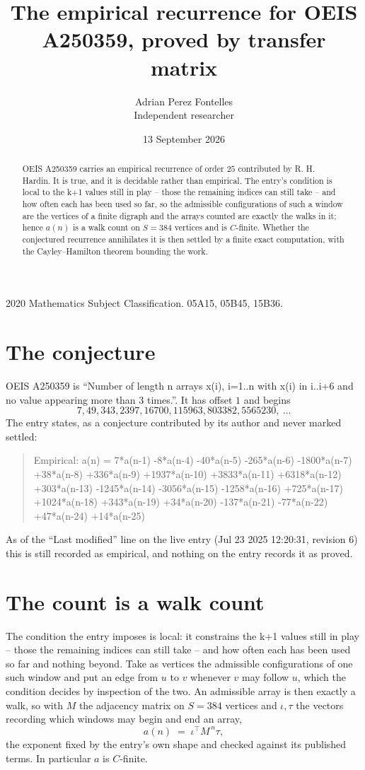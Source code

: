 \documentclass[11pt,a4paper]{article}
\title{The empirical recurrence for OEIS A250359, proved by transfer matrix}
\author{Adrian Perez Fontelles\\ \small Independent researcher}
\date{13 September 2026}
\theoremstyle{plain}
\theoremstyle{definition}
\begin{document}
\maketitle

\begin{abstract}
OEIS A250359 carries an empirical recurrence of order $25$ contributed by R. H. Hardin. It is
true, and it is decidable rather than empirical. The entry's condition is local to the k+1 values still in play -- those the remaining indices can still take -- and how often each has been used so far, so
the admissible configurations of such a window are the vertices of a finite digraph and the
arrays counted are exactly the walks in it; hence $a(n)$ is a walk count on $S=384$ vertices
and is $C$-finite. Whether the conjectured recurrence annihilates it is then settled by a
finite exact computation, with the Cayley--Hamilton theorem bounding the work.
\end{abstract}

\noindent\small 2020 Mathematics Subject Classification. 05A15, 05B45, 15B36.\normalsize

\section{The conjecture}

OEIS A250359 is ``Number of length n arrays x(i), i=1..n with x(i) in i..i+6 and no value appearing more than 3 times.''. It has offset $1$ and begins
\[
7, 49, 343, 2397, 16700, 115963, 803382, 5565230,\ \dots
\]
The entry states, as a conjecture contributed by its author and never marked settled:
\begin{quote}
Empirical: a(n) = 7*a(n-1) -8*a(n-4) -40*a(n-5) -265*a(n-6) -1800*a(n-7) +38*a(n-8) +336*a(n-9) +1937*a(n-10) +3833*a(n-11) +6318*a(n-12) +303*a(n-13) -1245*a(n-14) -3056*a(n-15) -1258*a(n-16) +725*a(n-17) +1024*a(n-18) +343*a(n-19) +34*a(n-20) -137*a(n-21) -77*a(n-22) +47*a(n-24) +14*a(n-25)
\end{quote}
As of the ``Last modified'' line on the live entry (Jul 23 2025 12:20:31, revision 6) this is still
recorded as empirical, and nothing on the entry records it as proved.

\section{The count is a walk count}

The condition the entry imposes is local: it constrains the k+1 values still in play -- those the remaining indices can still take -- and how often each has been used so far and nothing beyond. Take as
vertices the admissible configurations of one such window and put an edge from $u$ to $v$
whenever $v$ may follow $u$, which the condition decides by inspection of the two. An
admissible array is then exactly a walk, so with $M$ the adjacency matrix on $S=384$ vertices
and $\iota,\tau$ the vectors recording which windows may begin and end an array,
\[
a(n)\;=\;\iota^{\!\top}M^{\,n}\tau ,
\]
the exponent fixed by the entry's own shape and checked against its published terms. In
particular $a$ is $C$-finite.
\end{document}

